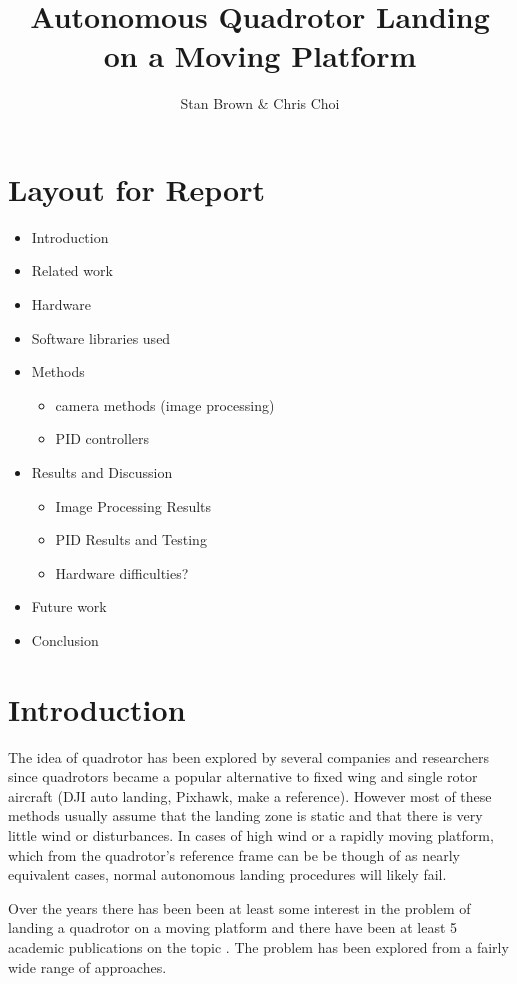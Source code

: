 \documentclass[11pt, twocolumn]{article}
\begin{document}
\title{Autonomous Quadrotor Landing on a Moving Platform}
\author{Stan Brown \& Chris Choi}
\date{}
\maketitle

\section{Layout for Report}
\begin{itemize}
	\item Introduction
	\item Related work
	\item Hardware
	\item Software libraries used
	\item Methods
	\begin{itemize}
		\item camera methods (image processing)
		\item PID controllers
	\end{itemize}
	\item Results and Discussion
	\begin{itemize}
		\item Image Processing Results
		\item PID Results and Testing
		\item Hardware difficulties? 
	\end{itemize}
	\item Future work 
	\item Conclusion
\end{itemize}


\section{Introduction}
The idea of quadrotor has been explored by several companies and researchers since quadrotors became a popular alternative to fixed wing and single rotor aircraft (DJI auto landing, Pixhawk, make a reference). However most of these methods usually assume that the landing zone is static and that there is very little wind or disturbances. In cases of high wind or a rapidly moving platform, which from the quadrotor's reference frame can be be though of as nearly equivalent cases, normal autonomous landing procedures will likely fail. 

Over the years there has been been at least some interest in the problem of landing a quadrotor on a moving platform and there have been at least 5 academic publications on the topic \cite{Lee2012, Kim2014, Voos2010, Friis2009, Ling2014, Herisse2012}. The problem has been explored from a fairly wide range of approaches. 
\end{document}
